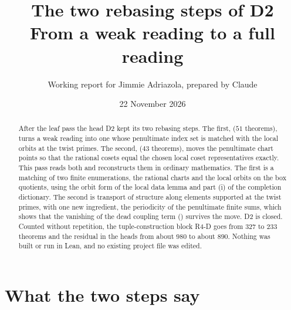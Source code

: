 \documentclass[11pt]{article}
\title{The two rebasing steps of D2\\ From a weak reading to a full reading}
\author{Working report for Jimmie Adriazola, prepared by Claude}
\date{22 November 2026}
\theoremstyle{remark}
\begin{document}
\maketitle

\begin{abstract}
After the leaf pass the head D2 kept its two rebasing steps. The first,  ($51$ theorems), turns a weak reading into one whose penultimate index set is matched with the local orbits at the twist primes. The second,  ($43$ theorems), moves the penultimate chart points so that the rational cosets equal the chosen local coset representatives exactly. This pass reads both and reconstructs them in ordinary mathematics. The first is a matching of two finite enumerations, the rational charts and the local orbits on the box quotients, using the orbit form of the local data lemma and part (i) of the completion dictionary. The second is transport of structure along elements supported at the twist primes, with one new ingredient, the periodicity of the penultimate finite sums, which shows that the vanishing of the dead coupling term () survives the move. D2 is closed. Counted without repetition, the tuple-construction block R4-D goes from $327$ to $233$ theorems and the residual in the heads from about $980$ to about $890$. Nothing was built or run in Lean, and no existing project file was edited.
\end{abstract}

\section{What the two steps say}
\end{document}
